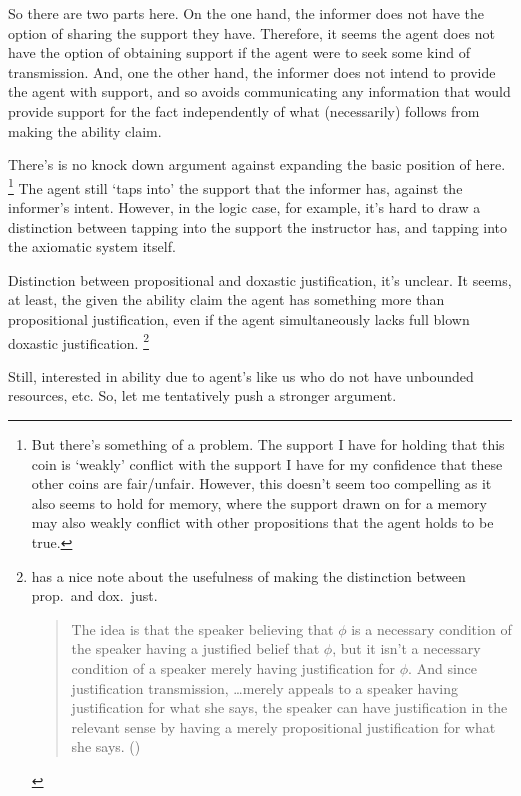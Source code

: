 \documentclass[10pt]{article}
\begin{document}
So there are two parts here.
On the one hand, the informer does not have the option of sharing the support they have.
Therefore, it seems the agent does not have the option of obtaining support if the agent were to seek some kind of transmission.
And, one the other hand, the informer does not intend to provide the agent with support, and so avoids communicating any information that would provide support for the fact independently of what (necessarily) follows from making the ability claim.

There's is no knock down argument against expanding the basic position of \citeauthor{Owens:2006tw} here.\nolinebreak
\footnote{
But there's something of a problem.
The support I have for holding that this coin is `weakly' conflict with the support I have for my confidence that these other coins are fair/unfair.
However, this doesn't seem too compelling as it also seems to hold for memory, where the support drawn on for a memory may also weakly conflict with other propositions that the agent holds to be true.
}
The agent still `taps into' the support that the informer has, against the informer's intent.
However, in the logic case, for example, it's hard to draw a distinction between tapping into the support the instructor has, and tapping into the axiomatic system itself.

Distinction between propositional and doxastic justification, it's unclear.
It seems, at least, the given the ability claim the agent has something more than propositional justification, even if the agent simultaneously lacks full blown doxastic justification.\nolinebreak
\footnote{
  \textcite{Wright:2016wl} has a nice note about the usefulness of making the distinction between prop.\ and dox.\ just.\
  \begin{quote}
    The idea is that the speaker believing that \(\phi\) is a necessary condition of the speaker having a justiﬁed belief that \(\phi\), but it isn't a necessary condition of a speaker merely having justification for \(\phi\).
    And since justification transmission, \dots merely appeals to a speaker having justification for what she says, the speaker can have justification in the relevant sense by having a merely propositional justification for what she says.\nolinebreak
    \mbox{}\hfill\mbox{(\citeyear[10]{Wright:2016wl})}
  \end{quote}
}

Still, interested in ability due to agent's like us who do not have unbounded resources, etc.
So, let me tentatively push a stronger argument.
\end{document}
